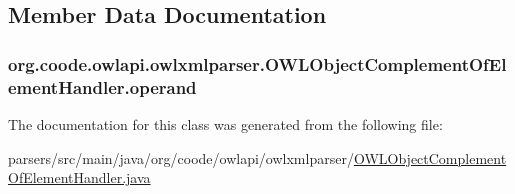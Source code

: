 \subsection{Member Data Documentation}
\hypertarget{classorg_1_1coode_1_1owlapi_1_1owlxmlparser_1_1_o_w_l_object_complement_of_element_handler_a41124617e92067a70dd77eaf26ec0af3}{
\subsubsection[{operand}]{ org.\-coode.\-owlapi.\-owlxmlparser.\-O\-W\-L\-Object\-Complement\-Of\-Element\-Handler.\-operand\hspace{0.3cm}{\ttfamily [private]}}}\label{classorg_1_1coode_1_1owlapi_1_1owlxmlparser_1_1_o_w_l_object_complement_of_element_handler_a41124617e92067a70dd77eaf26ec0af3}


The documentation for this class was generated from the following file\-:\begin{DoxyCompactItemize}
\item 
parsers/src/main/java/org/coode/owlapi/owlxmlparser/\hyperlink{_o_w_l_object_complement_of_element_handler_8java}{O\-W\-L\-Object\-Complement\-Of\-Element\-Handler.\-java}\end{DoxyCompactItemize}
